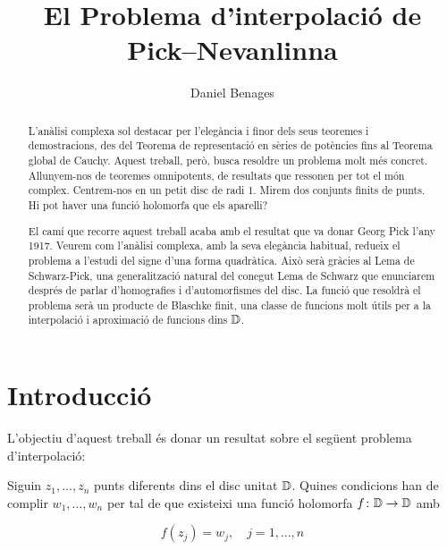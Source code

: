 \documentclass[dvipsnames, svgnames, leqno, a4paper, 12pt]{article}
\title{El Problema d'interpolació de Pick--Nevanlinna}
\date{}
\author{Daniel Benages}
\begin{document}
\tikzset{font=\scriptsize}
    \begin{titlepage}
      \maketitle

    \end{titlepage}

    \begin{abstract}
        L'anàlisi complexa sol destacar per l'elegància i finor dels seus teoremes i demostracions, des del Teorema de representació en sèries de potències fins al Teorema global de Cauchy. Aquest treball, però, busca resoldre un problema molt més concret. Allunyem-nos de teoremes omnipotents, de resultats que ressonen per tot el món complex. Centrem-nos en un petit disc de radi 1. Mirem dos conjunts finits de punts. Hi pot haver una funció holomorfa que els aparelli? 
        
        El camí que recorre aquest treball acaba amb el resultat que va donar Georg Pick l'any 1917. Veurem com l'anàlisi complexa, amb la seva elegància habitual, redueix el problema a l'estudi del signe d'una forma quadràtica. Això serà gràcies al Lema de Schwarz-Pick, una generalització natural del conegut Lema de Schwarz que enunciarem després de parlar d'homografies i d'automorfismes del disc. La funció que resoldrà el problema serà un producte de Blaschke finit, una classe de funcions molt útils per a la interpolació i aproximació de funcions dins $\mathbb{D}$.


    \end{abstract}
\newpage
\tableofcontents
\newpage
    \section{Introducció}
        L'objectiu d'aquest treball és donar un resultat sobre el següent problema d'interpolació:
        \begin{problem}\label{problema}
            Siguin $z_1,\dots,z_n$ punts diferents dins el disc unitat $\mathbb{D}$. Quines condicions han de complir $w_1,\dots,w_n$ per tal de que existeixi una funció holomorfa $f\colon\mathbb{D}\to\mathbb{D}$ amb
            
            \begin{equation}
                f(z_j)=w_j,\quad j=1,\dots,n
            \end{equation}
            
        \end{problem}
\end{document}
